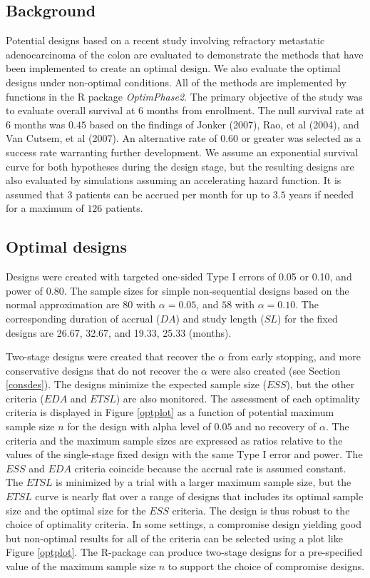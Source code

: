 \documentclass[12pt]{article}
\begin{document}
\subsection{Background}

Potential designs based on a recent study involving refractory metastatic adenocarcinoma of the
colon are evaluated to demonstrate the methods that have been implemented to create an optimal
design. We also evaluate the optimal designs under non-optimal conditions.  All of the methods are
implemented by functions in the R package {\it OptimPhase2}.  The primary objective of the study
was to evaluate overall survival at $6$ months from enrollment. The null survival rate at $6$
months was $0.45$ based on the findings of Jonker (2007), Rao, et al (2004), and Van Cutsem, et al
(2007). An alternative rate of $0.60$ or greater was selected as a success rate warranting further
development.  We assume an exponential survival curve for both hypotheses during the design stage,
but the resulting designs are also evaluated by
simulations assuming an accelerating hazard function. It is assumed that $3$ patients can be accrued per month for up to $3.5$ years if
needed for a maximum of $126$ patients.

\subsection{Optimal designs}

Designs were created with targeted one-sided Type I errors of 0.05 or 0.10, and power of 0.80.  The
sample sizes for simple non-sequential designs based on the  normal approximation are $80$  with
$\alpha=0.05$, and $58$ with $\alpha=0.10$.  The corresponding duration of accrual ($DA$) and study
length ($SL$) for the fixed designs are 26.67, 32.67, and 19.33, 25.33 (months).

Two-stage designs were created that recover the $\alpha$ from early stopping, and more conservative
designs that do not recover the $\alpha$ were also created (see Section \ref{consdes}).  The
designs minimize the expected sample size ($ESS$), but the other criteria ($EDA$ and $ETSL$) are
also monitored. The assessment of each optimality criteria is displayed in Figure \ref{optplot} as
a function of potential maximum sample size $n$ for the design with alpha level of $0.05$ and  no recovery of $\alpha$.  The criteria and the
maximum sample sizes are expressed as ratios relative to the values of the single-stage fixed
design with the same Type I error and power.  The $ESS$ and $EDA$ criteria coincide because the
accrual rate is assumed constant.  The $ETSL$ is minimized by a trial with a larger maximum sample
size, but the $ETSL$ curve is nearly flat over a range of designs that includes its optimal sample
size and the optimal size for the $ESS$ criteria. The design is thus robust to the choice of
optimality criteria.  In some settings, a compromise design yielding good but non-optimal results
for all of the criteria can be selected using a plot like Figure \ref{optplot}.  The R-package can
produce two-stage designs for a pre-specified value of the maximum sample size $n$ to support the
choice of compromise designs.
\end{document}
